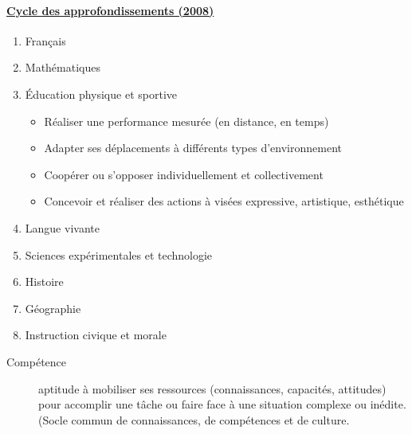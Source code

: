 \documentclass[10pt,french,twocolumn,landscape,a4paper]{article}
\begin{document}
\paragraph{\href{http://www.education.gouv.fr/bo/2008/hs3/programme_CE2_CM1_CM2.htm}{Cycle des approfondissements (2008)}}
\begin{enumerate}
\item Français
\item Mathématiques
\item Éducation physique et sportive
	\begin{itemize}
	\item Réaliser une performance mesurée (en distance, en temps)
	\item Adapter ses déplacements à différents types d’environnement
	\item Coopérer ou s’opposer individuellement et collectivement
	\item Concevoir et réaliser des actions à visées expressive, artistique, esthétique
	\end{itemize}
\item Langue vivante
\item Sciences expérimentales et technologie
\item Histoire
\item Géographie
\item Instruction civique et morale
\end{enumerate}

\begin{description}
\item[Compétence] aptitude à mobiliser ses ressources (connaissances, capacités, attitudes) pour accomplir une tâche ou faire face à une situation complexe ou inédite. (Socle commun de connaissances, de compétences et de culture.
\end{description}
\end{document}
